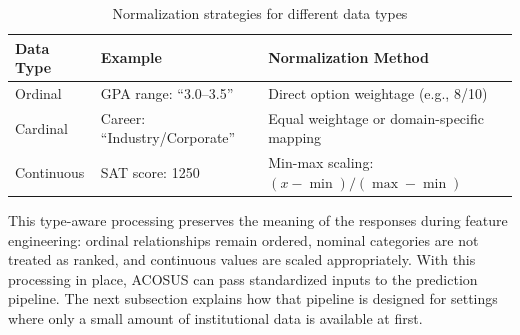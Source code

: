 \documentclass[letterpaper,11pt]{article}
\begin{document}
\begin{table}[htbp]
\centering
\caption{Normalization strategies for different data types}
\label{tab:normalization}
\begin{tabularx}{\textwidth}{@{}llY@{}}
\toprule
\textbf{Data Type} & \textbf{Example} & \textbf{Normalization Method} \\
\midrule
Ordinal & GPA range: ``3.0--3.5'' & Direct option weightage (e.g., 8/10) \\
Cardinal & Career: ``Industry/Corporate'' & Equal weightage or domain-specific mapping \\
Continuous & SAT score: 1250 & Min-max scaling: $(x - \min)/(\max - \min)$ \\
\bottomrule
\end{tabularx}
\end{table}

This type-aware processing preserves the meaning of the responses during feature engineering: ordinal relationships remain ordered, nominal categories are not treated as ranked, and continuous values are scaled appropriately. With this processing in place, ACOSUS can pass standardized inputs to the prediction pipeline. The next subsection explains how that pipeline is designed for settings where only a small amount of institutional data is available at first.
\end{document}
